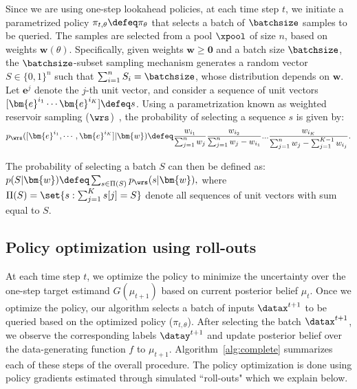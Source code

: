 Since we are using one-step lookahead policies, at each time step $t$,
we initiate a parametrized policy $\pi_{t,\theta}\defeq\pi_\theta$ that selects a  batch of $\batchsize$ samples to be queried. The samples are selected from a pool $\xpool$ of size $n$, based on weights ${\bm{w}}(\theta)$. %
 Specifically, given weights $\bm{w} \ge \bm{0}$ and a batch size $\batchsize$, the  $\batchsize$-subset sampling mechanism generates a random vector ${S} \in \{0,1\}^{n}$ such that $\sum_{i=1}^n S_i = \batchsize$, whose distribution depends on $\bm{w}$.
Let 
$\bm{e}^j$ denote the $j$-th unit vector, and consider a sequence of unit vectors $[\bm{e}^{i_1} \cdots \bm{e}^{i_K}] \defeq s$. Using a parametrization known as  weighted reservoir sampling ($\wrs$)~\citep{EfraimidisSp06}, the probability of  selecting a sequence $s$ is given by:
\begin{align}
    p_{\wrs}([\bm{e}^{i_1}, \cdots, \bm{e}^{i_K}]|\bm{w}) \defeq \frac{w_{i_1}}{\sum_{j=1}^n w_j}\frac{w_{i_2}}{\sum_{j=1}^n w_j-w_{i_1}}...\frac{w_{i_K}}{\sum_{j=1}^n w_j-\sum_{j=1}^{K-1}w_{i_j}}.
    \label{eqn:p-S-w-def}
 \end {align}

The probability of selecting a batch $S$ can then be defined as: $ p(S|\bm{w}) \defeq \sum_{s \in \Pi(S)} p_{\wrs}(s|\bm{w}),$
where $\Pi(S) = \set{s:  \sum_{j=1}^K s[j]= S}$ denote all sequences of unit vectors with sum equal to $S$.

\subsection{Policy optimization using roll-outs}
\label{sec:roll-out}



At each time step $t$, we optimize the policy to minimize the uncertainty over the one-step target estimand $G(\mu_{t+1})$ based on current posterior belief $\mu_t$.
Once we optimize the policy, our algorithm  selects a batch of inputs $\datax^{t+1}$ to be queried based on the optimized policy ($\pi_{t,\theta}$).  After selecting the batch $\datax^{t+1}$, we observe the corresponding labels $\datay^{t+1}$ and update posterior belief over the data-generating function $f$ to $\mu_{t+1}$. Algorithm~\ref{alg:complete} summarizes each of these steps of the overall procedure.   The policy optimization is done using policy gradients estimated through simulated ``roll-outs" which we explain below. 


